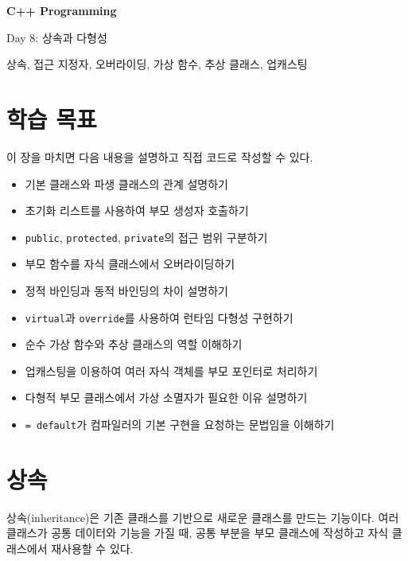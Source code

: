 \documentclass[11pt,a4paper]{article}
\begin{document}
\begin{titlepage}
    \centering
    \vspace*{3cm}
    {\Huge\bfseries C++ Programming\par}
    \vspace{0.8cm}
    {\LARGE Day 8: 상속과 다형성\par}
    \vspace{2cm}
    {\large 상속, 접근 지정자, 오버라이딩, 가상 함수, 추상 클래스, 업캐스팅\par}
    \vfill
\end{titlepage}

\tableofcontents
\newpage

\section{학습 목표}
\begin{learningbox}
이 장을 마치면 다음 내용을 설명하고 직접 코드로 작성할 수 있다.
\begin{itemize}[leftmargin=1.5em]
    \item 기본 클래스와 파생 클래스의 관계 설명하기
    \item 초기화 리스트를 사용하여 부모 생성자 호출하기
    \item \texttt{public}, \texttt{protected}, \texttt{private}의 접근 범위 구분하기
    \item 부모 함수를 자식 클래스에서 오버라이딩하기
    \item 정적 바인딩과 동적 바인딩의 차이 설명하기
    \item \texttt{virtual}과 \texttt{override}를 사용하여 런타임 다형성 구현하기
    \item 순수 가상 함수와 추상 클래스의 역할 이해하기
    \item 업캐스팅을 이용하여 여러 자식 객체를 부모 포인터로 처리하기
    \item 다형적 부모 클래스에서 가상 소멸자가 필요한 이유 설명하기
    \item \texttt{= default}가 컴파일러의 기본 구현을 요청하는 문법임을 이해하기
\end{itemize}
\end{learningbox}

\section{상속}
상속(inheritance)은 기존 클래스를 기반으로 새로운 클래스를 만드는 기능이다. 여러 클래스가 공통 데이터와 기능을 가질 때, 공통 부분을 부모 클래스에 작성하고 자식 클래스에서 재사용할 수 있다.
\end{document}
